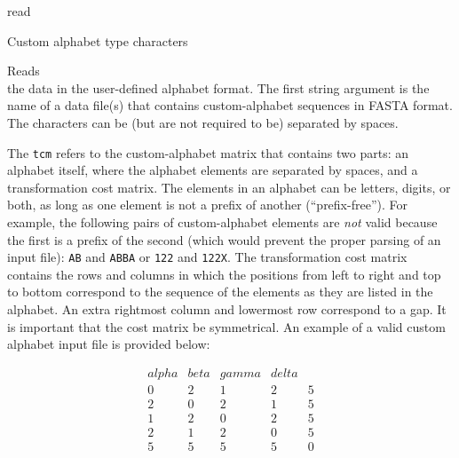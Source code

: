 \begin{command}{read}{}
\begin{arguments}
\begin{argumentgroup}{Custom alphabet type characters}
                {Reads \\ the data in the user-defined alphabet format. The first string argument is
                the name of a data file(s) that contains custom-alphabet sequences in FASTA format. 
                The characters can be (but are not required to be) separated by spaces.
                     
                \indent The \texttt{tcm} refers to the custom-alphabet matrix
                that contains two parts: an alphabet itself, where the alphabet
                elements are separated by spaces, and a transformation cost
                matrix. The elements in an alphabet can be letters, digits, or
                both, as long as one element is not a prefix of another
                (``prefix-free''). For example, the following pairs of
                custom-alphabet elements are \emph{not} valid because the first
                is a prefix of the second (which would prevent the proper
                parsing of an input file): \texttt{AB} and \texttt{ABBA} or
                \texttt{122} and \texttt{122X}.  The transformation cost matrix
                contains the rows and columns in which the positions from left
                to right and top to bottom correspond to the sequence of the
                elements as they are listed in the alphabet. An extra rightmost
                column and lowermost row correspond to a gap. It is important
                that the cost matrix  be symmetrical. An example of a valid
                custom alphabet input file is provided below:
             
                \begin{equation*}
                    \begin{array}{lllll}
                          alpha & beta & gamma & delta & \\
                        0 &     2 &    1 &     2 &     5 \\
                        2 &     0 &    2 &     1 &     5 \\
                        1 &     2 &    0 &     2 &     5 \\
                        2 &     1 &    2 &     0 &     5 \\
                        5 &     5 &    5 &     5 &     0
                     \end{array}
                \end{equation*} 

}
\end{argumentgroup}
\end{arguments}
\end{command}

